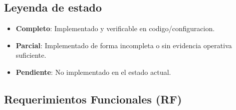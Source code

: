 \documentclass[12pt,a4paper]{article}
\begin{document}
\subsection{Leyenda de estado}
\begin{itemize}[leftmargin=*]
    \item \textbf{Completo}: Implementado y verificable en codigo/configuracion.
    \item \textbf{Parcial}: Implementado de forma incompleta o sin evidencia operativa suficiente.
    \item \textbf{Pendiente}: No implementado en el estado actual.
\end{itemize}

\subsection{Requerimientos Funcionales (RF)}
\renewcommand{\arraystretch}{1.2}
\end{document}
